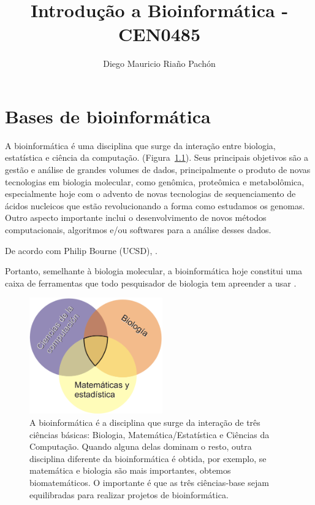 \documentclass[letter,11pt]{book}
\author{Diego Mauricio Ria\~{n}o Pach\'{o}n}
\title{Introdução a Bioinformática - CEN0485}
\begin{document}
\maketitle
\tableofcontents
\listoffigures

\chapter{Bases de bioinformática}


A bioinformática é uma disciplina que surge da interação entre biologia, estatística e ciência da computação. (Figura~\ref{bioinf}). Seus principais objetivos são a gestão e análise de grandes volumes de dados, principalmente o produto de novas tecnologias em biologia molecular, como genômica, proteômica e metabolômica, especialmente hoje com o advento de novas tecnologias de sequenciamento de ácidos nucleicos que estão revolucionando a forma como estudamos os genomas. Outro aspecto importante inclui o desenvolvimento de novos métodos computacionais, algoritmos e/ou softwares para a análise desses dados. 

De acordo com Philip Bourne (UCSD),  \citep{Bourne2004}.

Portanto, semelhante à biologia molecular, a bioinformática hoje constitui uma caixa de ferramentas que todo pesquisador de biologia tem apreender a usar \citetext{\citealp{Stein2008} apresenta um ponto de vista muito interessante}.

\begin{figure}[h]
\centering
   \includegraphics[height=5cm]{Figs/Bioinformatica.png}
  \caption[O que é bioinformática?]{\label{bioinf} A bioinformática é a disciplina que surge da interação de três ciências básicas: Biologia, Matemática/Estatística e Ciências da Computação. Quando alguna delas dominam o resto, outra disciplina diferente da bioinformática é obtida, por exemplo, se matemática e biologia são mais importantes, obtemos biomatemáticos. O importante é que as três ciências-base sejam equilibradas para realizar projetos de bioinformática.}
\end{figure}
\end{document}

